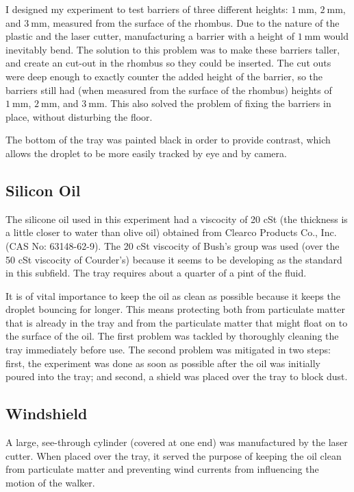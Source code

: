 I designed my experiment to test barriers of three different heights: $1~\mathrm{mm}$, $2~\mathrm{mm}$, and $3~\mathrm{mm}$, measured from the surface of the rhombus. Due to the nature of the plastic and the laser cutter, manufacturing a barrier with a height of $1~\mathrm{mm}$ would inevitably bend. The solution to this problem was to make these barriers taller, and create an cut-out in the rhombus so they could be inserted. The cut outs were deep enough to exactly counter the added height of the barrier, so the barriers still had (when measured from the surface of the rhombus) heights of $1~\mathrm{mm}$, $2~\mathrm{mm}$, and $3~\mathrm{mm}$. This also solved the problem of fixing the barriers in place, without disturbing the floor. 


The bottom of the tray was painted black in order to provide contrast, which allows the droplet to be more easily tracked by eye and by camera.





\subsection{Silicon Oil}
    The silicone oil used in this experiment had a viscocity of 20 cSt (the thickness is a little closer to water than olive oil) obtained from Clearco Products Co., Inc. (CAS No: 63148-62-9). The 20 cSt viscocity of Bush's group was used (over the 50 cSt viscocity of Courder's) because it seems to be developing as the standard in this subfield. The tray requires about a quarter of a pint of the fluid.
    
    It is of vital importance to keep the oil as clean as possible because it keeps the droplet bouncing for longer. This means protecting both from particulate matter that is already in the tray and from the particulate matter that might float on to the surface of the oil. The first problem was tackled by thoroughly cleaning the tray immediately before use. The second problem was mitigated in two steps: first, the experiment was done as soon as possible after the oil was initially poured into the tray; and second, a shield was placed over the tray to block dust.     

\subsection{Windshield}
    A large, see-through cylinder (covered at one end) was manufactured by the laser cutter. When placed over the tray, it served the purpose of keeping the oil clean from particulate matter and preventing wind currents from influencing the motion of the walker. 

